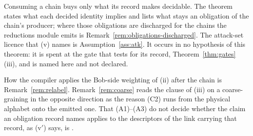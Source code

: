 
Consuming a chain buys only what its record makes decidable. The theorem
states what each decided identity implies and lists what stays an obligation
of the chain's producer; where those obligations are discharged for the chains
the reductions module emits is Remark~\ref{rem:obligations-discharged}.
The attack-set licence that (v) names is Assumption~\ref{ass:atk}. It occurs
in no hypothesis of this theorem: it is spent at the gate that tests for its
record, Theorem~\ref{thm:gates}\,(iii), and is named here and not declared.

How the compiler applies the Bob-side weighting of (ii) after the chain is
Remark~\ref{rem:relabel}. Remark~\ref{rem:coarse} reads the clause of (iii)
on a coarse-graining in the opposite direction as the reason (C2) runs from
the physical alphabet onto the emitted one. That (A1)--(A3) do not decide whether the claim an obligation
record names applies to the descriptors of the link carrying that record,
as (v$'$) says, is
.

